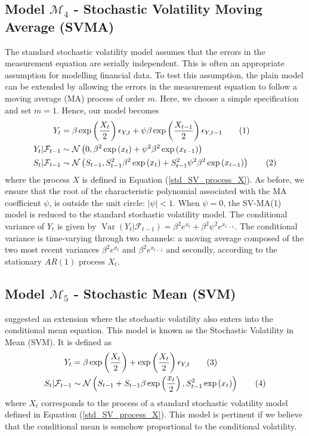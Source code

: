 \documentclass[11pt,a4,twosided,singlespacing,titlepagenumber=on]{scrreprt}
\numberwithin{equation}{chapter} %
\theoremstyle{remark}
\DeclareMathOperator{\var}{Var}
\newcommand\numberthis{\addtocounter{equation}{1}\tag{\theequation}}
\begin{document}
\subsection{Model $\mathcal{M}_4$ - Stochastic Volatility Moving Average (SVMA)}
The standard stochastic volatility model assumes that the errors in the measurement equation are serially independent. This is often an appropriate assumption for modelling financial data. To test this assumption, the plain model can be extended by allowing the errors in the measurement equation to follow a moving average (MA) process of order $m$. Here, we choose a simple specification and set $m = 1$. Hence, our model becomes
\begin{align*}
Y_t							      &= \beta \exp \left( \frac{X_t}{2} \right) \epsilon_{Y,t} + \psi \beta \exp \left( \frac{X_{t-1}}{2} \right) \epsilon_{Y,t-1} \numberthis \\
Y_t	| \mathcal{F}_{t-1}		&\sim \mathcal{N} \left(0, \beta^2 \exp \left( x_t \right) + \psi^2 \beta^2 \exp \left( x_{t-1} \right) \right) \\
S_t | \mathcal{F}_{t-1}	  &\sim \mathcal{N} \left(S_{t-1}, S_{t-1}^2 \beta^2 \exp \left( x_t \right) +  S_{t-1}^2 \psi^2 \beta^2 \exp \left( x_{t-1} \right) \right) \numberthis
\end{align*}
where the process $X$ is defined in Equation (\ref{std_SV_process_X}). As before, we ensure that the root of the characteristic polynomial associated with the MA coefficient $\psi$, is outside the unit circle: $|\psi| < 1$. When $\psi = 0$, the SV-MA(1) model is reduced to the standard stochastic volatility model. The conditional
variance of $Y_t$ is given by $\var \left(Y_t | \mathcal{F}_{t-1} \right) = \beta^2 e^{x_t} + \beta^2 \psi^2 e^{x_{t-1}}$. The conditional variance is time-varying through two channels: a moving average composed of the two most recent variances $\beta^2 e^{x_t}$ and $\beta^2 e^{x_{t-1}}$ and secondly, according to the stationary $AR(1)$ process $X_t$.

\subsection{Model $\mathcal{M}_5$ - Stochastic Mean (SVM)}
\cite{koopman2002} suggested an extension where the stochastic volatility also enters into the conditional mean equation. This model is known as the Stochastic Volatility in Mean (SVM). It is defined as
\begin{align*}
Y_t 			 &= \beta \exp\left(\frac{X_t}{2}\right) + \exp\left(\frac{X_t}{2}\right) \epsilon_{Y,t} \numberthis\\
S_t | \mathcal{F}_{t-1}  &\sim \mathcal{N} \left(S_{t-1} + S_{t-1} \beta \exp\left(\frac{x_t}{2}\right), S_{t-1}^2 \exp\left(x_t\right) \right) \numberthis
\end{align*}
where $X_t$ corresponds to the process of a standard stochastic volatility model defined in Equation (\ref{std_SV_process_X}). This model is pertinent if we believe that the conditional mean is somehow proportional to the conditional volatility.
\end{document}
